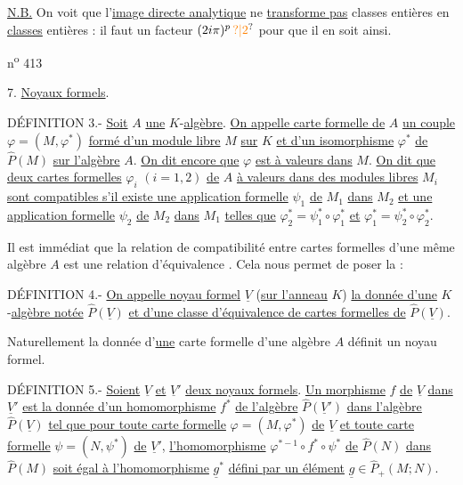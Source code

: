 \uline{N.B.} On voit que l'\uline{image directe analytique} ne \uline{transforme pas} classes entières en \uline{classes} entières : il faut un facteur $(2i\pi)^p\,\unsure{?|2}$ pour que il en soit ainsi.


\hfill n\textsuperscript{o} 413

7. \uline{Noyaux formels}.

DÉFINITION 3.- \uline{Soit} $A$ \uline{une} $K$-\uline{algèbre}. \uline{On appelle carte formelle de} $A$ \uline{un couple} $\varphi=(M,\varphi^*)$ \uline{formé d'un module libre} $M$ \uline{sur} $K$ \uline{et d'un isomorphisme} $\varphi^*$ \uline{de} $\widehat P(M)$ \uline{sur l'algèbre} $A$. \uline{On dit encore que} $\varphi$ \uline{est à valeurs dans} $M$. \uline{On dit que deux cartes formelles} $\varphi_i$ $(i=1,2)$ \uline{de} $A$ \uline{à valeurs dans des modules libres} $M_i$ \uline{sont compatibles s'il existe une application formelle} $\psi_1$ \uline{de} $M_1$ \uline{dans} $M_2$ \uline{et une application formelle} $\psi_2$ \uline{de} $M_2$ \uline{dans} $M_1$ \uline{telles que} $\varphi_2^*=\psi_1^*\circ\varphi_1^*$ \uline{et} $\varphi_1^*=\psi_2^*\circ\varphi_2^*$.

Il est immédiat que la relation de compatibilité entre cartes formelles d'une même algèbre $A$ est une relation d'équivalence . Cela nous permet de poser la :

DÉFINITION 4.- \uline{On appelle noyau formel} $\underline V$ (\uline{sur l'anneau} $K$) \uline{la donnée d'une} $K$-\uline{algèbre notée} $\widehat P(\underline V)$ \uline{et d'une classe d'équivalence de cartes formelles de} $\widehat P(\underline V)$.

Naturellement la donnée d'\uline{une} carte formelle d'une algèbre $A$ définit un noyau formel.

DÉFINITION 5.- \uline{Soient} $\underline V$ \uline{et} $\underline V'$ \uline{deux noyaux formels}. \uline{Un morphisme} $f$ \uline{de} $\underline V$ \uline{dans} $\underline V'$ \uline{est la donnée d'un homomorphisme} $f^*$ \uline{de l'algèbre} $\widehat P(\underline V')$ \uline{dans l'algèbre} $\widehat P(\underline V)$ \uline{tel que pour toute carte formelle} $\varphi=(M,\varphi^*)$ \uline{de} $\underline V$ \uline{et toute carte formelle} $\psi=(N,\psi^*)$ \uline{de} $\underline V'$, \uline{l'homomorphisme} $\varphi^{*-1}\circ f^*\circ\psi^*$ \uline{de} $\widehat P(N)$ \uline{dans} $\widehat P(M)$ \uline{soit égal à l'homomorphisme} $\underline g^*$ \uline{défini par un élément} $\underline g\in\widehat P_+(M;N)$.


